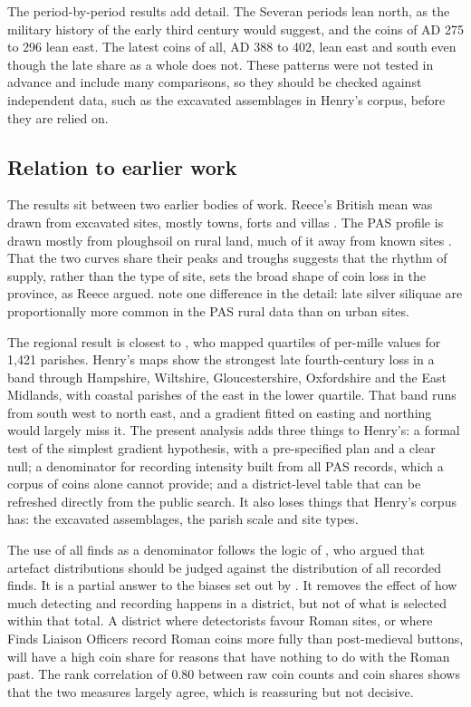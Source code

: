 \documentclass[11pt,a4paper]{article}
\begin{document}
The period-by-period results add detail. The Severan periods lean north, as the military history of the early third century would suggest, and the coins of AD 275 to 296 lean east. The latest coins of all, AD 388 to 402, lean east and south even though the late share as a whole does not. These patterns were not tested in advance and include many comparisons, so they should be checked against independent data, such as the excavated assemblages in Henry's corpus, before they are relied on.

\subsection{Relation to earlier work}
The results sit between two earlier bodies of work. Reece's British mean was drawn from excavated sites, mostly towns, forts and villas \citep{reece1991,reece1995}. The PAS profile is drawn mostly from ploughsoil on rural land, much of it away from known sites \citep{brindle2014}. That the two curves share their peaks and troughs suggests that the rhythm of supply, rather than the type of site, sets the broad shape of coin loss in the province, as Reece argued. \citet{walton2016} note one difference in the detail: late silver siliquae are proportionally more common in the PAS rural data than on urban sites.

The regional result is closest to \citet{henry2024}, who mapped quartiles of per-mille values for 1,421 parishes. Henry's maps show the strongest late fourth-century loss in a band through Hampshire, Wiltshire, Gloucestershire, Oxfordshire and the East Midlands, with coastal parishes of the east in the lower quartile. That band runs from south west to north east, and a gradient fitted on easting and northing would largely miss it. The present analysis adds three things to Henry's: a formal test of the simplest gradient hypothesis, with a pre-specified plan and a clear null; a denominator for recording intensity built from all PAS records, which a corpus of coins alone cannot provide; and a district-level table that can be refreshed directly from the public search. It also loses things that Henry's corpus has: the excavated assemblages, the parish scale and site types.

The use of all finds as a denominator follows the logic of \citet{bevan2012}, who argued that artefact distributions should be judged against the distribution of all recorded finds. It is a partial answer to the biases set out by \citet{robbins2012,robbins2013}. It removes the effect of how much detecting and recording happens in a district, but not of what is selected within that total. A district where detectorists favour Roman sites, or where Finds Liaison Officers record Roman coins more fully than post-medieval buttons, will have a high coin share for reasons that have nothing to do with the Roman past. The rank correlation of 0.80 between raw coin counts and coin shares shows that the two measures largely agree, which is reassuring but not decisive.
\end{document}
